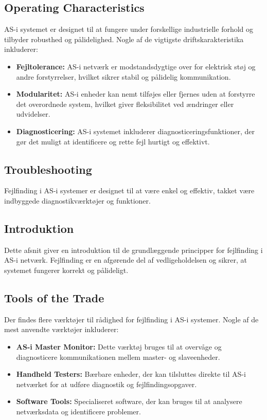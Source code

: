\subsection{Operating Characteristics}
AS-i systemet er designet til at fungere under forskellige industrielle forhold og tilbyder robusthed og pålidelighed. Nogle af de vigtigste driftskarakteristika inkluderer:
\begin{itemize}
	\item \textbf{Fejltolerance:} AS-i netværk er modstandsdygtige over for elektrisk støj og andre forstyrrelser, hvilket sikrer stabil og pålidelig kommunikation.
	\item \textbf{Modularitet:} AS-i enheder kan nemt tilføjes eller fjernes uden at forstyrre det overordnede system, hvilket giver fleksibilitet ved ændringer eller udvidelser.
	\item \textbf{Diagnosticering:} AS-i systemet inkluderer diagnosticeringsfunktioner, der gør det muligt at identificere og rette fejl hurtigt og effektivt.
\end{itemize}

\subsection{Troubleshooting}
Fejlfinding i AS-i systemer er designet til at være enkel og effektiv, takket være indbyggede diagnostikværktøjer og funktioner.

\subsection*{Introduktion}
Dette afsnit giver en introduktion til de grundlæggende principper for fejlfinding i AS-i netværk. Fejlfinding er en afgørende del af vedligeholdelsen og sikrer, at systemet fungerer korrekt og pålideligt.

\subsection*{Tools of the Trade}
Der findes flere værktøjer til rådighed for fejlfinding i AS-i systemer. Nogle af de mest anvendte værktøjer inkluderer:
\begin{itemize}
	\item \textbf{AS-i Master Monitor:} Dette værktøj bruges til at overvåge og diagnosticere kommunikationen mellem master- og slaveenheder.
	\item \textbf{Handheld Testers:} Bærbare enheder, der kan tilsluttes direkte til AS-i netværket for at udføre diagnostik og fejlfindingsopgaver.
	\item \textbf{Software Tools:} Specialiseret software, der kan bruges til at analysere netværksdata og identificere problemer.
\end{itemize}


